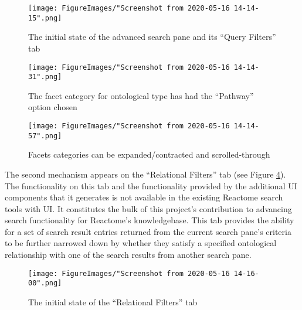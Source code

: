 \documentclass[12pt, letterpaper]{report}
\begin{document}
\begin{figure}[h!]
	\begin{center}
		\texttt{[image: FigureImages/"Screenshot from 2020-05-16 14-14-15".png]}
	\end{center}
	\caption{The initial state of the advanced search pane and its ``Query Filters'' tab}
	\label{fig:AdvancedSearchInitial}
\end{figure}

\begin{figure}[h!]
	\begin{center}
		\texttt{[image: FigureImages/"Screenshot from 2020-05-16 14-14-31".png]}
	\end{center}
	\caption{The facet category for ontological type has had the ``Pathway'' option chosen}
	\label{fig:AdvancedSearchPathwayFacetOptionChosen}
\end{figure}

\begin{figure}[h!]
	\begin{center}
		\texttt{[image: FigureImages/"Screenshot from 2020-05-16 14-14-57".png]}
	\end{center}
	\caption{Facets categories can be expanded/contracted and scrolled-through}
	\label{fig:AdvancedSearchFacetExpandAndScroll}
\end{figure}

\newpage

The second mechanism appears on the ``Relational Filters'' tab (see Figure \ref{fig:RelationalFiltersTabInitial}). The functionality on this tab and the functionality provided by the additional UI components that it generates is not available in the existing Reactome search tools with UI. It constitutes the bulk of this project's contribution to advancing search functionality for Reactome's knowledgebase. This tab provides the ability for a set of search result entries returned from the current search pane's criteria to be further narrowed down by whether they satisfy a specified ontological relationship with one of the search results from another search pane.

\newpage

\begin{figure}[h!]
	\begin{center}
		\texttt{[image: FigureImages/"Screenshot from 2020-05-16 14-16-00".png]}
	\end{center}
	\caption{The initial state of the ``Relational Filters'' tab}
	\label{fig:RelationalFiltersTabInitial}
\end{figure}
\end{document}

